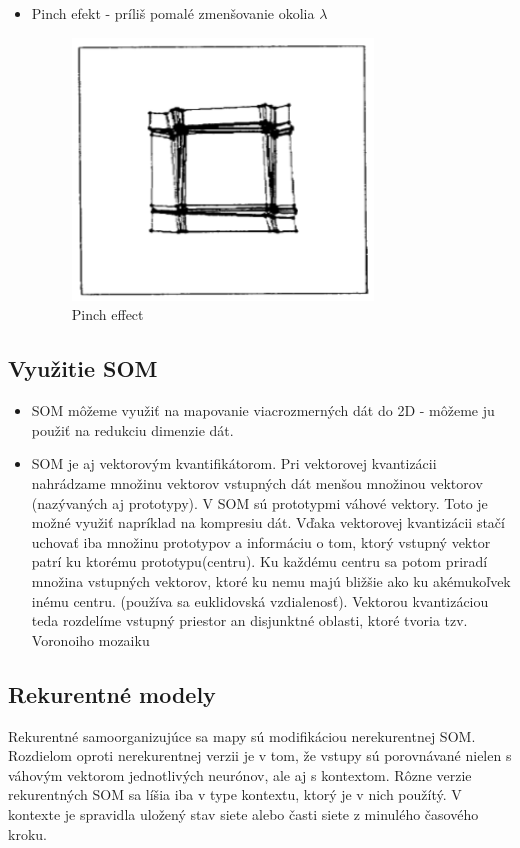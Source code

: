\begin{itemize}
	\item Pinch efekt - príliš pomalé zmenšovanie okolia $\lambda$
	\begin{figure}[H]
		\centering
		\includegraphics[width=8cm]{assets/pinch_effect}
		\caption{Pinch effect}
	\end{figure}
\end{itemize}



\subsection{Využitie SOM}
\begin{itemize}
\item SOM môžeme využiť na mapovanie viacrozmerných dát do 2D - môžeme ju použiť na redukciu dimenzie dát.
\item SOM je aj vektorovým kvantifikátorom. Pri vektorovej kvantizácii nahrádzame množinu vektorov vstupných dát menšou množinou vektorov (nazývaných aj prototypy). V SOM sú prototypmi
		váhové vektory. Toto je možné využiť napríklad na kompresiu dát. Vďaka vektorovej kvantizácii stačí uchovať iba množinu prototypov a informáciu o tom, ktorý vstupný vektor patrí 
		ku ktorému prototypu(centru). Ku každému centru sa potom priradí množina vstupných vektorov, ktoré ku nemu majú bližšie ako ku akémukoľvek inému centru. (používa sa euklidovská vzdialenosť).
		Vektorou kvantizáciou teda rozdelíme vstupný priestor an disjunktné oblasti, ktoré tvoria tzv. Voronoiho mozaiku
\end{itemize}


\subsection{Rekurentné modely}
Rekurentné samoorganizujúce sa mapy sú modifikáciou nerekurentnej SOM.
Rozdielom oproti nerekurentnej verzii je v tom, že vstupy sú porovnávané
nielen s váhovým vektorom jednotlivých neurónov, ale aj s kontextom.
Rôzne verzie rekurentných SOM sa líšia iba v type kontextu, ktorý je v nich použítý. 
V kontexte je spravidla uložený stav siete alebo časti siete z minulého časového kroku.

